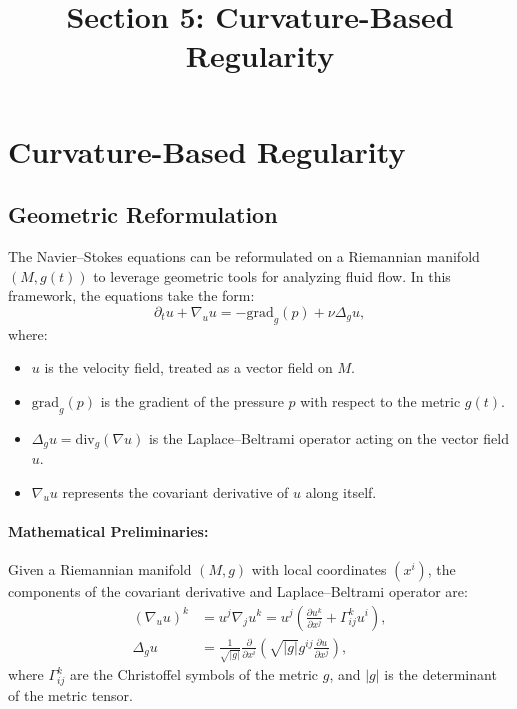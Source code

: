 \documentclass[12pt]{article}
\theoremstyle{definition}
\begin{document}
\title{Section 5: Curvature-Based Regularity}
\author{}
\date{}
\maketitle

\section{Curvature-Based Regularity}

\subsection{Geometric Reformulation}
The Navier--Stokes equations can be reformulated on a Riemannian manifold $(M, g(t))$ to leverage geometric tools for analyzing fluid flow. In this framework, the equations take the form:
\begin{equation}
\partial_t u + \nabla_u u = -\text{grad}_g(p) + \nu \Delta_g u, \label{eq:riemannian_navier_stokes}
\end{equation}
where:
\begin{itemize}
    \item $u$ is the velocity field, treated as a vector field on $M$.
    \item $\text{grad}_g(p)$ is the gradient of the pressure $p$ with respect to the metric $g(t)$.
    \item $\Delta_g u = \text{div}_g(\nabla u)$ is the Laplace--Beltrami operator acting on the vector field $u$.
    \item $\nabla_u u$ represents the covariant derivative of $u$ along itself.
\end{itemize}

\paragraph{Mathematical Preliminaries:}
Given a Riemannian manifold $(M, g)$ with local coordinates $(x^i)$, the components of the covariant derivative and Laplace--Beltrami operator are:
\begin{align}
(\nabla_u u)^k &= u^j \nabla_j u^k = u^j \left( \frac{\partial u^k}{\partial x^j} + \Gamma^k_{ij} u^i \right), \label{eq:covariant_derivative} \\
\Delta_g u &= \frac{1}{\sqrt{|g|}} \frac{\partial}{\partial x^i} \left( \sqrt{|g|} g^{ij} \frac{\partial u}{\partial x^j} \right), \label{eq:laplace_beltrami}
\end{align}
where $\Gamma^k_{ij}$ are the Christoffel symbols of the metric $g$, and $|g|$ is the determinant of the metric tensor.
\end{document}
